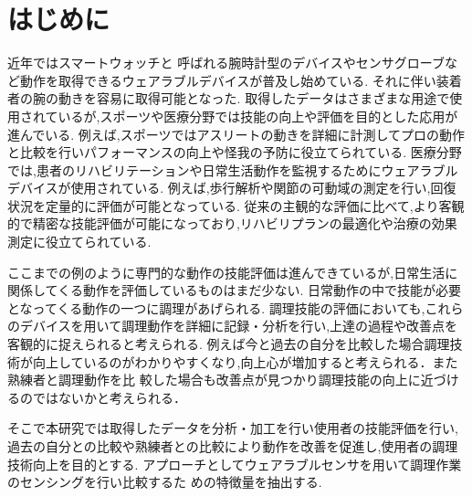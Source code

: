 \section{はじめに}
近年ではスマートウォッチと
呼ばれる腕時計型のデバイスやセンサグローブなど動作を取得できるウェアラブルデバイスが普及し始めている.
それに伴い装着者の腕の動きを容易に取得可能となった.
取得したデータはさまざまな用途で使用されているが,スポーツや医療分野では技能の向上や評価を目的とした応用が進んでいる.
例えば,スポーツではアスリートの動きを詳細に計測してプロの動作と比較を行いパフォーマンスの向上や怪我の予防に役立てられている.
医療分野では,患者のリハビリテーションや日常生活動作を監視するためにウェアラブルデバイスが使用されている.
例えば,歩行解析や関節の可動域の測定を行い,回復状況を定量的に評価が可能となっている.
従来の主観的な評価に比べて,より客観的で精密な技能評価が可能になっており,リハビリプランの最適化や治療の効果測定に役立てられている.

ここまでの例のように専門的な動作の技能評価は進んできているが,日常生活に関係してくる動作を評価しているものはまだ少ない.
日常動作の中で技能が必要となってくる動作の一つに調理があげられる.
調理技能の評価においても,これらのデバイスを用いて調理動作を詳細に記録・分析を行い,上達の過程や改善点を客観的に捉えられると考えられる.
例えば今と過去の自分を比較した場合調理技術が向上しているのがわかりやすくなり,向上心が増加すると考えられる．また熟練者と調理動作を比
較した場合も改善点が見つかり調理技能の向上に近づけるのではないかと考えられる．

そこで本研究では取得したデータを分析・加工を行い使用者の技能評価を行い,
過去の自分との比較や熟練者との比較により動作を改善を促進し,使用者の調理技術向上を目的とする.
アプローチとしてウェアラブルセンサを用いて調理作業のセンシングを行い比較するた
めの特徴量を抽出する.